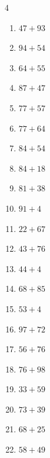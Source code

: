 \begin{multicols}{4}
\begin{enumerate}
  \item $47+93$
        \phantom{$=140$}

  \item $94+54$
        \phantom{$=148$}

  \item $64+55$
        \phantom{$=119$}

  \item $87+47$
        \phantom{$=134$}

  \item $77+57$
        \phantom{$=134$}

  \item $77+64$
        \phantom{$=141$}

  \item $84+54$
        \phantom{$=138$}

  \item $84+18$
        \phantom{$=102$}

  \item $81+38$
        \phantom{$=119$}

  \item $91+4$
        \phantom{$=95$}

  \item $22+67$
        \phantom{$=89$}

  \item $43+76$
        \phantom{$=119$}

  \item $44+4$
        \phantom{$=48$}

  \item $68+85$
        \phantom{$=153$}

  \item $53+4$
        \phantom{$=57$}

  \item $97+72$
        \phantom{$=169$}

  \item $56+76$
        \phantom{$=132$}

  \item $76+98$
        \phantom{$=174$}

  \item $33+59$
        \phantom{$=92$}

  \item $73+39$
        \phantom{$=112$}

  \item $68+25$
        \phantom{$=93$}

  \item $58+49$
        \phantom{$=107$}


\end{enumerate}
\end{multicols}
